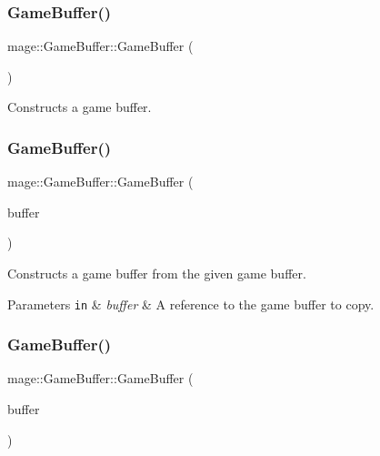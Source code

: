 \subsubsection{\texorpdfstring{Game\+Buffer()}{GameBuffer()}\hspace{0.1cm}{\footnotesize\ttfamily [1/3]}}
{\footnotesize\ttfamily mage\+::\+Game\+Buffer\+::\+Game\+Buffer (\begin{DoxyParamCaption}{ }\end{DoxyParamCaption})}

Constructs a game buffer. \hypertarget{structmage_1_1_game_buffer_a654d6f8d44dcc00b6693840125fb81ff}{}\label{structmage_1_1_game_buffer_a654d6f8d44dcc00b6693840125fb81ff} 
\subsubsection{\texorpdfstring{Game\+Buffer()}{GameBuffer()}\hspace{0.1cm}{\footnotesize\ttfamily [2/3]}}
{\footnotesize\ttfamily mage\+::\+Game\+Buffer\+::\+Game\+Buffer (\begin{DoxyParamCaption}\item[{const \hyperlink{structmage_1_1_game_buffer}{Game\+Buffer} \&}]{buffer }\end{DoxyParamCaption})\hspace{0.3cm}{\ttfamily [default]}}

Constructs a game buffer from the given game buffer.


\begin{DoxyParams}[1]{Parameters}
\mbox{\tt in}  & {\em buffer} & A reference to the game buffer to copy. \\
\hline
\end{DoxyParams}
\hypertarget{structmage_1_1_game_buffer_a012cbf18353f056094ebc27d19f93ad1}{}\label{structmage_1_1_game_buffer_a012cbf18353f056094ebc27d19f93ad1} 
\subsubsection{\texorpdfstring{Game\+Buffer()}{GameBuffer()}\hspace{0.1cm}{\footnotesize\ttfamily [3/3]}}
{\footnotesize\ttfamily mage\+::\+Game\+Buffer\+::\+Game\+Buffer (\begin{DoxyParamCaption}\item[{\hyperlink{structmage_1_1_game_buffer}{Game\+Buffer} \&\&}]{buffer }\end{DoxyParamCaption})\hspace{0.3cm}{\ttfamily [default]}}

